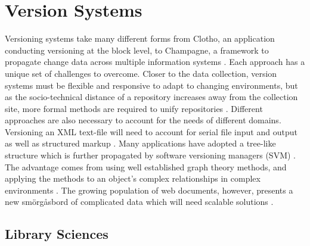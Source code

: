 \section{Version Systems} \label{sec:system}

Versioning systems take many different forms from Clotho, an application conducting versioning at the block level, to Champagne, a framework to propagate change data across multiple information systems \cite{Flouris04clotho:transparent} \cite{Systems02champagne:data}.
Each approach has a unique set of challenges to overcome.
Closer to the data collection, version systems must be flexible and responsive to adapt to changing environments, but as the socio-technical distance of a repository increases away from the collection site, more formal methods are required to unify repositories \cite{Baker2009}.
Different approaches are also necessary to account for the needs of different domains.
Versioning an XML text-file will need to account for serial file input and output as well as structured markup \cite{Chien:2000:VMX:646544.696357}.
Many applications have adopted a tree-like structure which is further propagated by software versioning managers (SVM) \cite{Stuckenholz:2005:CEV:1039174.1039197}.
The advantage comes from using well established graph theory methods, and applying the methods to an object's complex relationships in complex environments \cite{Dijkstra1994}.
The growing population of web documents, however, presents a new smörgåsbord of complicated data which will need scalable solutions \cite{Berberich:2007:TMT:1277741.1277831}.

\subsection{Library Sciences}


